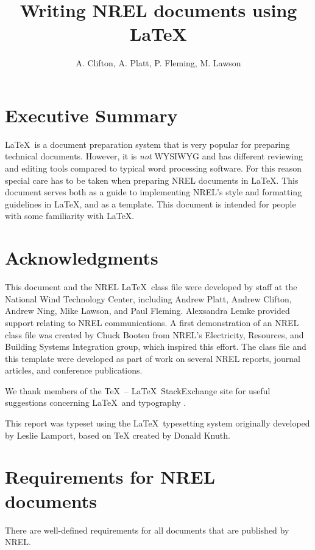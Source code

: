 \documentclass[12pt,letterpaper]{report}
\title{Writing NREL documents using \LaTeX}
\author{A. Clifton, A. Platt, P. Fleming, M. Lawson}
\begin{document}
\maketitle
\frontmatter
\chapter*{Executive Summary}
\LaTeX\ is a document preparation system that is very popular for preparing technical documents. However, it is \emph{not} WYSIWYG and has different reviewing and editing tools compared to typical word processing software. For this reason special care has to be taken when preparing NREL documents in \LaTeX. This document serves both as a guide to implementing NREL's style and formatting guidelines in \LaTeX, and as a template. This document is intended for people with some familiarity with \LaTeX.

\chapter*{Acknowledgments}
This document and the NREL \LaTeX\ class file were developed by staff at the National Wind Technology Center, including Andrew Platt, Andrew Clifton, Andrew Ning, Mike Lawson, and Paul Fleming. Alexsandra Lemke provided support relating to NREL communications. A first demonstration of an NREL class file was created by Chuck Booten from NREL's Electricity, Resources, and Building Systems Integration group, which inspired this effort. The class file and this template were developed as part of work on several NREL reports, journal articles, and conference publications. 

We thank members of the \TeX\ -- \LaTeX\ StackExchange site for useful suggestions concerning \LaTeX\ and typography \citep{texstackexchange}.

This report was typeset using the \LaTeX\ typesetting system originally developed by Leslie Lamport, based on TeX created by Donald Knuth.

\clearpage
\renewcommand{\contentsname}{Table of Contents}
\tableofcontents
\clearpage
\listoffigures
\listoftables
\mainmatter


\chapter{Requirements for NREL documents}

There are well-defined requirements for all documents that are published by NREL. 
\end{document}

